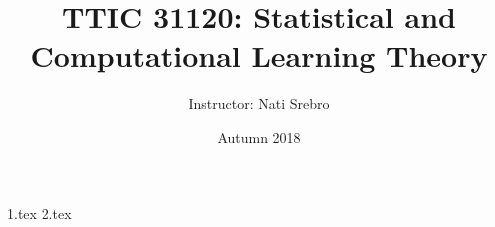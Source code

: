 \documentclass{article}
\begin{document}
\title{TTIC 31120: Statistical and Computational Learning Theory}
\date{Autumn 2018}
\author{Instructor: Nati Srebro}
\maketitle

\tableofcontents
\eject


{1.tex}
{2.tex}
\end{document}
